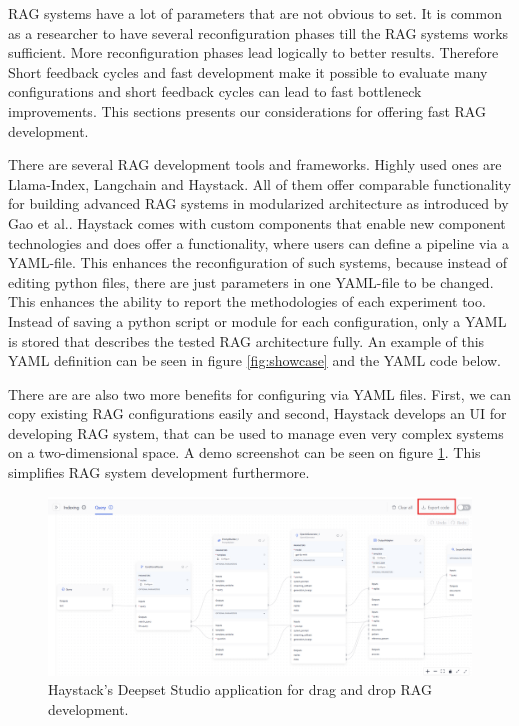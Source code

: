 RAG systems have a lot of parameters that are not obvious to set. It is common as a researcher to have several reconfiguration phases till the RAG systems works sufficient. More reconfiguration phases lead logically to better results. Therefore Short feedback cycles and fast development make it possible to evaluate many configurations and short feedback cycles can lead to fast bottleneck improvements. This sections presents our considerations for offering fast RAG development.

There are several RAG development tools and frameworks. Highly used ones are Llama-Index\cite{Liu_LlamaIndex_2022}, Langchain\cite{Chase_LangChain_2022} and Haystack\cite{Pietsch_Haystack_the_end-to-end_2019}. All of them offer comparable functionality for building advanced RAG systems in modularized architecture as introduced by Gao et al.\cite{Gao.18.12.2023}. Haystack comes with custom components that enable new component technologies and does offer a functionality, where users can define a pipeline via a YAML-file. This enhances the reconfiguration of such systems, because instead of editing python files, there are just parameters in one YAML-file to be changed. This enhances the ability to report the methodologies of each experiment too. Instead of saving a python script or module for each configuration, only a YAML is stored that describes the tested RAG architecture fully. An example of this YAML definition can be seen in figure \ref{fig:showcase} and the YAML code below.

There are are also two more benefits for configuring via YAML files. First, we can copy existing RAG configurations easily and second, Haystack develops an UI for developing RAG system, that can be used to manage even very complex systems on a two-dimensional space. A demo screenshot can be seen on figure \ref{fig:deepsetstudio}. This simplifies RAG system development furthermore. 


\begin{figure}[b]
  \centering
  \includegraphics[width=\textwidth]{images/deepset-studio-zoomed-in.png}
  \caption{Haystack's Deepset Studio application for drag and drop RAG development.\cite{deepsetstudio.10.03.2025}}
  \label{fig:deepsetstudio}
\end{figure}


